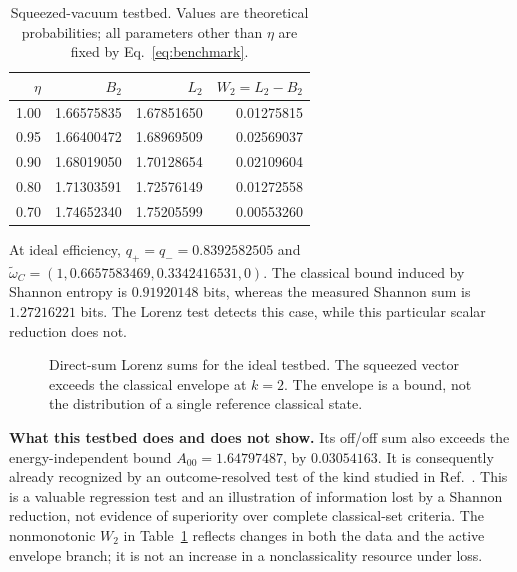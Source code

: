 \documentclass[11pt,a4paper]{article}
\begin{document}
\begin{table}[htbp]
\centering
\caption{Squeezed-vacuum testbed. Values are theoretical probabilities; all
parameters other than $\eta$ are fixed by Eq.~\eqref{eq:benchmark}.}
\begin{tabular}{rrrr}
\toprule
$\eta$ & $B_2$ & $L_2$ & $W_2=L_2-B_2$\\
\midrule
1.00 & 1.66575835 & 1.67851650 & 0.01275815\\
0.95 & 1.66400472 & 1.68969509 & 0.02569037\\
0.90 & 1.68019050 & 1.70128654 & 0.02109604\\
0.80 & 1.71303591 & 1.72576149 & 0.01272558\\
0.70 & 1.74652340 & 1.75205599 & 0.00553260\\
\bottomrule
\end{tabular}
\label{tab:sq}
\end{table}

At ideal efficiency, $q_+=q_-=0.8392582505$ and
$\widetilde\omega_C=(1,0.6657583469,0.3342416531,0)$.
The classical bound induced by Shannon entropy is $0.91920148$ bits, whereas
the measured Shannon sum is $1.27216221$ bits. The Lorenz test detects this
case, while this particular scalar reduction does not.

\begin{figure}[htbp]
\centering
{}
\caption{Direct-sum Lorenz sums for the ideal testbed. The squeezed vector
exceeds the classical envelope at $k=2$. The envelope is a bound, not the
distribution of a single reference classical state.}
\end{figure}

\textbf{What this testbed does and does not show.} Its off/off sum also exceeds
the energy-independent bound $A_{00}=1.64797487$, by $0.03054163$.
It is consequently already recognized by an outcome-resolved test of the kind
studied in Ref.~\cite{Kovtoniuk2024}. This is a valuable regression test and
an illustration of information lost by a Shannon reduction, not evidence of
superiority over complete classical-set criteria. The nonmonotonic $W_2$ in
Table~\ref{tab:sq} reflects changes in both the data and the active envelope
branch; it is not an increase in a nonclassicality resource under loss.
\end{document}
